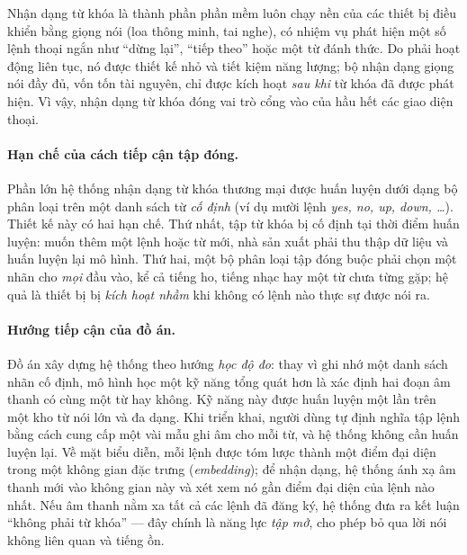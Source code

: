 \documentclass[12pt,a4paper]{report}
\begin{document}
Nhận dạng từ khóa là thành phần phần mềm luôn chạy nền của các thiết bị điều khiển
bằng giọng nói (loa thông minh, tai nghe), có nhiệm vụ phát hiện một số lệnh
thoại ngắn như ``dừng lại'', ``tiếp theo'' hoặc một từ đánh thức. Do phải hoạt
động liên tục, nó được thiết kế nhỏ và tiết kiệm năng lượng; bộ nhận dạng giọng nói đầy đủ, vốn tốn tài nguyên, chỉ được kích hoạt
\emph{sau khi} từ khóa đã được phát hiện. Vì vậy, nhận dạng từ khóa đóng vai trò
cổng vào của hầu hết các giao diện thoại.

\paragraph{Hạn chế của cách tiếp cận tập đóng.}
Phần lớn hệ thống nhận dạng từ khóa thương mại được huấn luyện dưới dạng bộ phân
loại trên một danh sách từ \emph{cố định} (ví dụ mười lệnh \textit{yes, no, up,
down, \dots}).
Thiết kế này có hai hạn chế. Thứ nhất, tập từ khóa bị cố định tại thời
điểm huấn luyện: muốn thêm một lệnh hoặc từ mới, nhà sản xuất phải thu
thập dữ liệu và huấn luyện lại mô hình. Thứ hai, một bộ phân loại tập đóng buộc
phải chọn một nhãn cho \emph{mọi} đầu vào, kể cả tiếng ho, tiếng nhạc hay một từ
chưa từng gặp; hệ quả là thiết bị bị \emph{kích hoạt nhầm} khi không có lệnh nào
thực sự được nói ra.

\paragraph{Hướng tiếp cận của đồ án.}
Đồ án xây dựng hệ thống theo hướng \emph{học độ đo}: thay vì ghi nhớ một danh sách
nhãn cố định, mô hình học một kỹ năng tổng quát hơn là xác định hai đoạn âm thanh
có cùng một từ hay không. Kỹ năng này được huấn luyện một lần trên một kho từ
nói lớn và đa dạng. Khi triển khai, người dùng tự định nghĩa tập lệnh
bằng cách cung cấp một vài mẫu ghi âm cho mỗi từ, và hệ thống không cần huấn luyện
lại. Về mặt biểu diễn, mỗi lệnh được tóm lược thành một điểm đại diện trong một
không gian đặc trưng (\emph{embedding}); để nhận dạng, hệ thống ánh xạ âm thanh
mới vào không gian này và xét xem nó gần điểm đại diện của lệnh nào nhất. Nếu âm
thanh nằm xa tất cả các lệnh đã đăng ký, hệ thống đưa ra kết luận ``không phải từ
khóa'' --- đây chính là năng lực \emph{tập mở}, cho phép bỏ qua lời nói không liên
quan và tiếng ồn.
\end{document}
